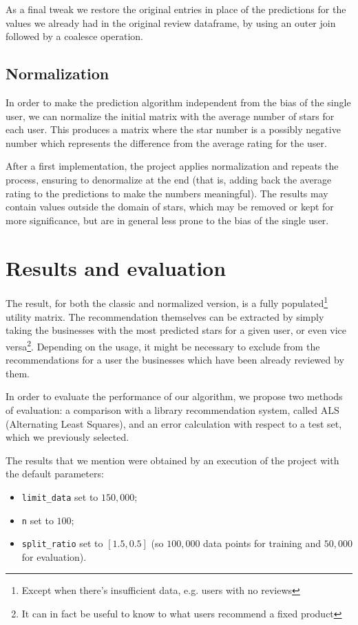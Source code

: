 \documentclass[11pt,a4paper]{article}
\newcommand{\code}{\texttt}
\begin{document}
\begin{multicols}{2}
As a final tweak we restore the original entries in place of the predictions for the values we already had in the original review dataframe, by using an outer join followed by a coalesce operation.


\subsection{Normalization}
In order to make the prediction algorithm independent from the bias of the single user, we can normalize the initial matrix with the average number of stars for each user.
This produces a matrix where the star number is a possibly negative number which represents the difference from the average rating for the user.

After a first implementation, the project applies normalization and repeats the process, ensuring to denormalize at the end (that is, adding back the average rating to the predictions to make the numbers meaningful).
The results may contain values outside the domain of stars, which may be removed or kept for more significance, but are in general less prone to the bias of the single user.


\section{Results and evaluation}\label{evaluation}
The result, for both the classic and normalized version, is a fully populated\footnote{Except when there's insufficient data, e.g. users with no reviews} utility matrix.
The recommendation themselves can be extracted by simply taking the businesses with the most predicted stars for a given user, or even vice versa\footnote{It can in fact be useful to know to what users recommend a fixed product}.
Depending on the usage, it might be necessary to exclude from the recommendations for a user the businesses which have been already reviewed by them.

In order to evaluate the performance of our algorithm, we propose two methods of evaluation: a comparison with a library recommendation system, called ALS (Alternating Least Squares), and an error calculation with respect to a test set, which we previously selected.

The results that we mention were obtained by an execution of the project with the default parameters:
\begin{itemize}
	\item \code{limit\_data} set to $150,000$;
	\item \code{n} set to $100$;
	\item \code{split\_ratio} set to $[1.5, 0.5]$ (so $100,000$ data points for training and $50,000$ for evaluation).
\end{itemize}



\end{multicols}
\end{document}
